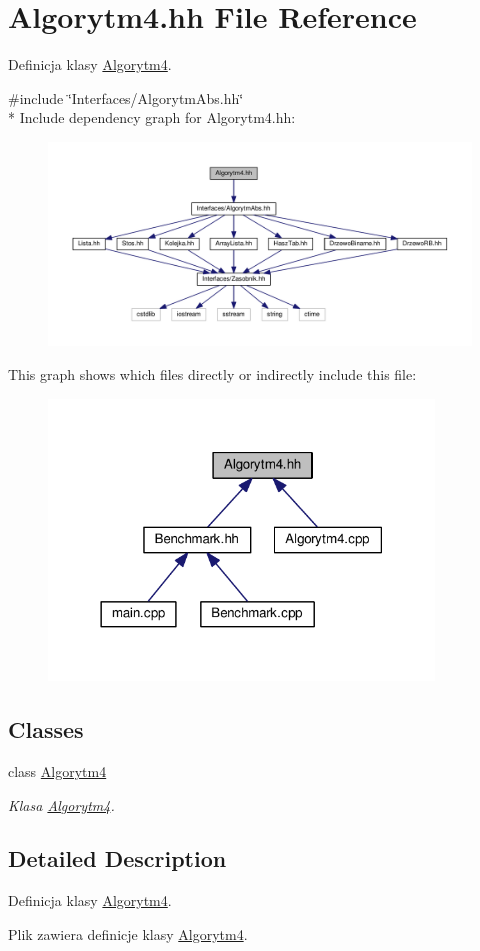 \hypertarget{a00027}{}\section{Algorytm4.\+hh File Reference}
\label{a00027}


Definicja klasy \hyperlink{a00005}{Algorytm4}.  


{\ttfamily \#include \char`\"{}Interfaces/\+Algorytm\+Abs.\+hh\char`\"{}}\\*
Include dependency graph for Algorytm4.\+hh\+:
\nopagebreak
\begin{figure}[H]
\begin{center}
\leavevmode
\includegraphics[width=350pt]{a00070}
\end{center}
\end{figure}
This graph shows which files directly or indirectly include this file\+:
\nopagebreak
\begin{figure}[H]
\begin{center}
\leavevmode
\includegraphics[width=290pt]{a00071}
\end{center}
\end{figure}
\subsection*{Classes}
\begin{DoxyCompactItemize}
\item 
class \hyperlink{a00005}{Algorytm4}
\begin{DoxyCompactList}\small\item\em Klasa \hyperlink{a00005}{Algorytm4}. \end{DoxyCompactList}\end{DoxyCompactItemize}


\subsection{Detailed Description}
Definicja klasy \hyperlink{a00005}{Algorytm4}. 

Plik zawiera definicje klasy \hyperlink{a00005}{Algorytm4}. 